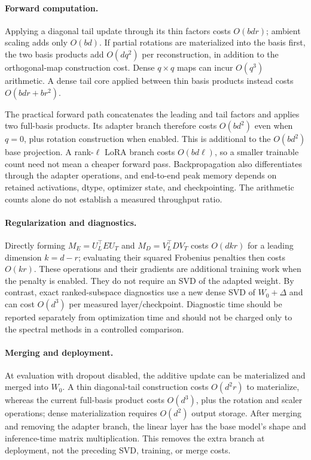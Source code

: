 \paragraph{Forward computation.}
Applying a diagonal tail update through its thin factors costs $O(bdr)$; ambient scaling adds only $O(bd)$. If partial rotations are materialized into the basis first, the two basis products add $O(dq^2)$ per reconstruction, in addition to the orthogonal-map construction cost. Dense $q\times q$ maps can incur $O(q^3)$ arithmetic. A dense tail core applied between thin basis products instead costs $O(bdr+br^2)$.

The practical forward path concatenates the leading and tail factors and applies two full-basis products. Its adapter branch therefore costs $O(bd^2)$ even when $q=0$, plus rotation construction when enabled. This is additional to the $O(bd^2)$ base projection. A rank-$\ell$ LoRA branch costs $O(bd\ell)$, so a smaller trainable count need not mean a cheaper forward pass. Backpropagation also differentiates through the adapter operations, and end-to-end peak memory depends on retained activations, dtype, optimizer state, and checkpointing. The arithmetic counts alone do not establish a measured throughput ratio.

\paragraph{Regularization and diagnostics.}
Directly forming $M_E=U_L^\top E U_T$ and $M_D=V_L^\top D V_T$ costs $O(dkr)$ for a leading dimension $k=d-r$; evaluating their squared Frobenius penalties then costs $O(kr)$. These operations and their gradients are additional training work when the penalty is enabled. They do not require an SVD of the adapted weight. By contrast, exact ranked-subspace diagnostics use a new dense SVD of $W_0+\Delta$ and can cost $O(d^3)$ per measured layer/checkpoint. Diagnostic time should be reported separately from optimization time and should not be charged only to the spectral methods in a controlled comparison.

\paragraph{Merging and deployment.}
At evaluation with dropout disabled, the additive update can be materialized and merged into $W_0$. A thin diagonal-tail construction costs $O(d^2r)$ to materialize, whereas the current full-basis product costs $O(d^3)$, plus the rotation and scaler operations; dense materialization requires $O(d^2)$ output storage. After merging and removing the adapter branch, the linear layer has the base model's shape and inference-time matrix multiplication. This removes the extra branch at deployment, not the preceding SVD, training, or merge costs.
